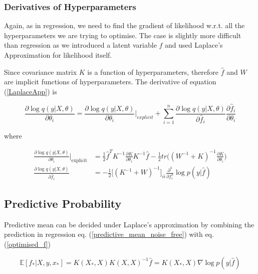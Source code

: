 \documentclass[11pt]{report}
\numberwithin{equation}{chapter}
\begin{document}
\begin{spacing}{2}
\subsubsection{Derivatives of Hyperparameters}

Again, as in regression, we need to find the gradient of likelihood w.r.t. all the hyperparameters we are trying to optimise. The case is slightly more difficult than regression as we introduced a latent variable $f$ and used Laplace's Approximation for likelihood itself. 

Since covariance matrix $K$ is a function of hyperparameters, therefore $\hat{f}$ and $W$ are implicit functions of hyperparameters. The derivative of equation (\ref{LaplaceApp}) is


\begin{equation}
\frac{\partial \operatorname{log}q(y|X,\theta)}{\partial \theta_i} = \frac{\partial \operatorname{log}q(y|X,\theta)}{\partial \theta_i}\bigg|_{explicit} + \sum_{i=1}^n \frac{\partial \operatorname{log}q(y|X,\theta)}{\partial \hat{f}_i}\frac{\partial \hat{f}_i}{\partial \theta_i}
\end{equation}

where


\begin{align} 
\label{eq:al1}
\frac{\partial \operatorname{log}q(y|X,\theta)}{\partial \theta_i}\bigg|_{\operatorname{explicit}} &= \frac{1}{2}\hat{f}^T K^{-1}\frac{\partial K}{\partial \theta_i}K^{-1}\hat{f} - \frac{1}{2}tr\Big((W^{-1}+K)^{-1}\frac{\partial K}{\partial \theta_i}\Big) \\ 
\label{eq:al2}
\frac{\partial \operatorname{log}q(y|X,\theta)}{\partial \hat{f}_i} &= -\frac{1}{2} \big[(K^{-1}+W)^{-1}\big]_{ii}\frac{\partial^3}{\partial f_i^3}\operatorname{log}p(y|\hat{f})
\end{align}



\subsection{Predictive Probability}
Predictive mean can be decided under Laplace's approximation by combining the prediction in regression eq. (\ref{predictive_mean_noise_free}) with eq. (\ref{optimised_f})

\begin{equation}
\label{predictive_mean_classification}
\mathbb{E}[f_\ast|X,y,x_\ast] = K(X_\ast, X)K(X, X)^{-1}\hat{f} = K(X_\ast, X) \nabla\operatorname{log}p(y|\hat{f}) 
\end{equation}


\end{spacing}
\end{document}
